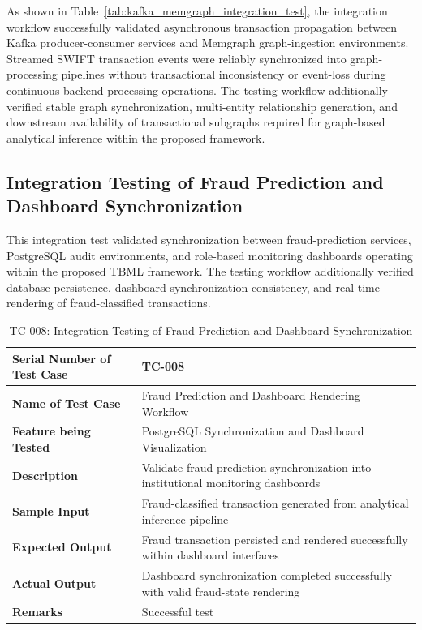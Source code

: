 \renewcommand{\arraystretch}{1}

As shown in Table~\ref{tab:kafka_memgraph_integration_test}, the integration workflow successfully validated asynchronous transaction propagation between Kafka producer-consumer services and Memgraph graph-ingestion environments. Streamed SWIFT transaction events were reliably synchronized into graph-processing pipelines without transactional inconsistency or event-loss during continuous backend processing operations. The testing workflow additionally verified stable graph synchronization, multi-entity relationship generation, and downstream availability of transactional subgraphs required for graph-based analytical inference within the proposed framework.


\subsection[Integration Testing of Fraud Prediction and Dashboard Synchronization]{\textbf{Integration Testing of Fraud Prediction and Dashboard Synchronization}}

This integration test validated synchronization between fraud-prediction services, PostgreSQL audit environments, and role-based monitoring dashboards operating within the proposed TBML framework. The testing workflow additionally verified database persistence, dashboard synchronization consistency, and real-time rendering of fraud-classified transactions.

\renewcommand{\arraystretch}{1.3}

\begin{table}[H]
\centering
\caption{TC-008: Integration Testing of Fraud Prediction and Dashboard Synchronization}
\label{tab:fraud_prediction_dashboard_integration_test}
\vspace{0.2cm}

\begin{tabular}{|p{4.2cm}|p{9cm}|}
\hline
\textbf{Serial Number of Test Case} & TC-008 \\ \hline
\textbf{Name of Test Case} & Fraud Prediction and Dashboard Rendering Workflow \\ \hline
\textbf{Feature being Tested} & PostgreSQL Synchronization and Dashboard Visualization \\ \hline
\textbf{Description} & Validate fraud-prediction synchronization into institutional monitoring dashboards \\ \hline
\textbf{Sample Input} & Fraud-classified transaction generated from analytical inference pipeline \\ \hline
\textbf{Expected Output} & Fraud transaction persisted and rendered successfully within dashboard interfaces \\ \hline
\textbf{Actual Output} & Dashboard synchronization completed successfully with valid fraud-state rendering \\ \hline
\textbf{Remarks} & Successful test \\ \hline
\end{tabular}
\end{table}

